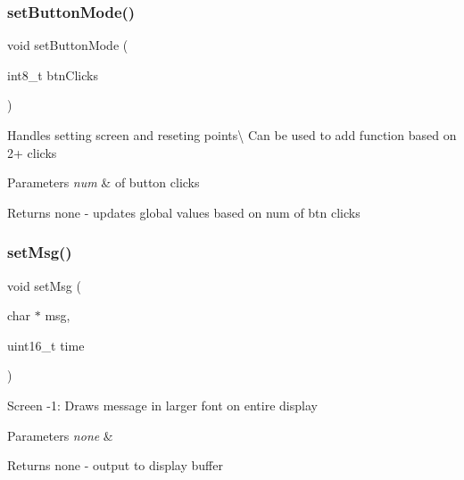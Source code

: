 \subsubsection{\texorpdfstring{set\+Button\+Mode()}{setButtonMode()}}
{\footnotesize\ttfamily void set\+Button\+Mode (\begin{DoxyParamCaption}\item[{int8\+\_\+t}]{btn\+Clicks }\end{DoxyParamCaption})}

Handles setting screen and reseting points\textbackslash{} Can be used to add function based on 2+ clicks


\begin{DoxyParams}{Parameters}
{\em num} & of button clicks \\
\hline
\end{DoxyParams}
\begin{DoxyReturn}{Returns}
none -\/ updates global values based on num of btn clicks 
\end{DoxyReturn}
\hypertarget{_u_s_b___tester___o_l_e_d__128x64___beta__2_82_8ino_a0387211b0ea0866fc96dfcf7bd3ba0bd}{}\label{_u_s_b___tester___o_l_e_d__128x64___beta__2_82_8ino_a0387211b0ea0866fc96dfcf7bd3ba0bd} 
\subsubsection{\texorpdfstring{set\+Msg()}{setMsg()}}
{\footnotesize\ttfamily void set\+Msg (\begin{DoxyParamCaption}\item[{char $\ast$}]{msg,  }\item[{uint16\+\_\+t}]{time }\end{DoxyParamCaption})}

Screen -\/1\+: Draws message in larger font on entire display


\begin{DoxyParams}{Parameters}
{\em none} & \\
\hline
\end{DoxyParams}
\begin{DoxyReturn}{Returns}
none -\/ output to display buffer 
\end{DoxyReturn}
\hypertarget{_u_s_b___tester___o_l_e_d__128x64___beta__2_82_8ino_a4fc01d736fe50cf5b977f755b675f11d}{}\label{_u_s_b___tester___o_l_e_d__128x64___beta__2_82_8ino_a4fc01d736fe50cf5b977f755b675f11d} 
